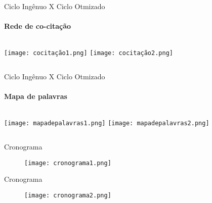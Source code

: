 \begin{frame}[t]{Ciclo Ingênuo X Ciclo Otmizado}
    \transboxout[duration=0.5]
    \framesubtitle{Rede de co-citação}
    
    \begin{columns}
        \newline  
            \texttt{[image: cocitação1.png]}
        \newline  
         \texttt{[image: cocitação2.png]}
    \end{columns}
    
\end{frame}
\begin{frame}[t]{Ciclo Ingênuo X Ciclo Otmizado}
    \transboxout[duration=0.5]
    \framesubtitle{Mapa de palavras}
    
    \begin{columns}
        \newline  
            \texttt{[image: mapadepalavras1.png]}
        \newline  
         \texttt{[image: mapadepalavras2.png]}
    \end{columns}
    
\end{frame}
\begin{frame}[c]{Cronograma}
        \begin{figure}
        \texttt{[image: cronograma1.png]}
    \end{figure}
\end{frame}
\begin{frame}[c]{Cronograma}
        \begin{figure}
        \texttt{[image: cronograma2.png]}
    \end{figure}
\end{frame}
